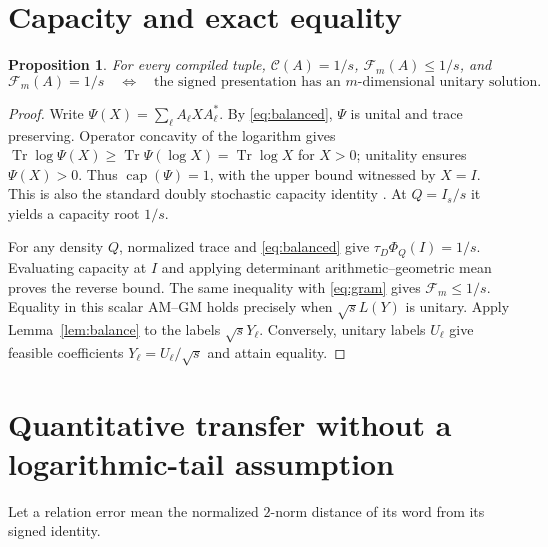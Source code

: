\documentclass[11pt]{article}
\newtheorem{proposition}[theorem]{Proposition}
\newcommand{\Tr}{\operatorname{Tr}}
\newcommand{\F}{\mathcal F}
\newcommand{\K}{\mathcal C}
\newcommand{\capop}{\operatorname{cap}}
\begin{document}
\section{Capacity and exact equality}
\begin{proposition}\label{prop:capacity}
For every compiled tuple, $\K(A)=1/s$, $\F_m(A)\le1/s$, and
\[
 \F_m(A)=1/s
 \quad\Longleftrightarrow\quad
 \text{the signed presentation has an $m$-dimensional unitary solution}.
\]
\end{proposition}
\begin{proof}
Write $\Psi(X)=\sum_\ell A_\ell XA_\ell^*$. By \eqref{eq:balanced}, $\Psi$ is unital and trace preserving. Operator concavity of the logarithm gives
$\Tr\log\Psi(X)\ge\Tr\Psi(\log X)=\Tr\log X$ for $X>0$; unitality ensures $\Psi(X)>0$. Thus $\capop(\Psi)=1$, with the upper bound witnessed by $X=I$. This is also the standard doubly stochastic capacity identity \cite{ggow}. At $Q=I_s/s$ it yields a capacity root $1/s$.

For any density $Q$, normalized trace and \eqref{eq:balanced} give $\tau_D\Phi_Q(I)=1/s$. Evaluating capacity at $I$ and applying determinant arithmetic--geometric mean proves the reverse bound. The same inequality with \eqref{eq:gram} gives $\F_m\le1/s$. Equality in this scalar AM--GM holds precisely when $\sqrt{s}L(Y)$ is unitary. Apply Lemma~\ref{lem:balance} to the labels $\sqrt{s}Y_\ell$. Conversely, unitary labels $U_\ell$ give feasible coefficients $Y_\ell=U_\ell/\sqrt{s}$ and attain equality.
\end{proof}

\section{Quantitative transfer without a logarithmic-tail assumption}
Let a relation error mean the normalized $2$-norm distance of its word from its signed identity.
\end{document}
